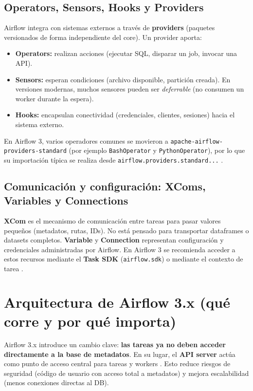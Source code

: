 \subsection{Operators, Sensors, Hooks y Providers}
Airflow integra con sistemas externos a través de \textbf{providers} (paquetes versionados de forma independiente del core). Un provider aporta:
\begin{itemize}[leftmargin=*]
  \item \textbf{Operators:} realizan acciones (ejecutar SQL, disparar un job, invocar una API).
  \item \textbf{Sensors:} esperan condiciones (archivo disponible, partición creada). En versiones modernas, muchos sensores pueden ser \textit{deferrable} (no consumen un worker durante la espera).
  \item \textbf{Hooks:} encapsulan conectividad (credenciales, clientes, sesiones) hacia el sistema externo.
\end{itemize}
En Airflow 3, varios operadores comunes se movieron a \texttt{apache-airflow-providers-standard} (por ejemplo \texttt{BashOperator} y \texttt{PythonOperator}), por lo que su importación típica se realiza desde \texttt{airflow.providers.standard...} \cite{airflow_upgrade_3_breaking,airflow_standard_provider_bash}.

\subsection{Comunicación y configuración: XComs, Variables y Connections}
\textbf{XCom} es el mecanismo de comunicación entre tareas para pasar valores pequeños (metadatos, rutas, IDs). No está pensado para transportar dataframes o datasets completos.
\textbf{Variable} y \textbf{Connection} representan configuración y credenciales administradas por Airflow. En Airflow 3 se recomienda acceder a estos recursos mediante el \textbf{Task SDK} (\texttt{airflow.sdk}) o mediante el contexto de tarea \cite{airflow_public_interface}.

\section{Arquitectura de Airflow 3.x (qué corre y por qué importa)}
Airflow 3.x introduce un cambio clave: \textbf{las tareas ya no deben acceder directamente a la base de metadatos}. En su lugar, el \textbf{API server} actúa como punto de acceso central para tareas y workers \cite{airflow_upgrading_3_stable}. Esto reduce riesgos de seguridad (código de usuario con acceso total a metadatos) y mejora escalabilidad (menos conexiones directas al DB).

